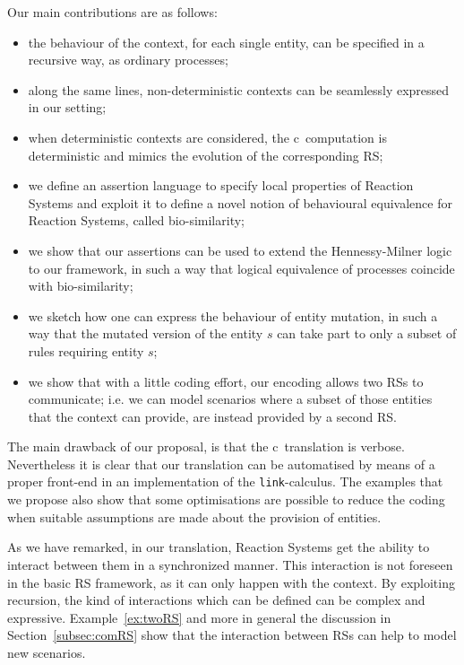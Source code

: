 Our main contributions are as follows:
\begin{itemize}
\item the behaviour of the context, for each single 
entity,
can be
specified in a recursive way, as ordinary processes;
\item along the same lines, non-deterministic contexts can be seamlessly expressed in our setting; 
\item when deterministic contexts are considered, the c\CNA \
computation is deterministic and mimics the evolution of the corresponding RS;
\item we define an assertion language to specify local properties of 
Reaction Systems and exploit it to define a novel notion of behavioural equivalence for Reaction Systems, called bio-similarity;
\item we show that our assertions can be used to extend the Hennessy-Milner logic to our framework, in such a way that logical equivalence of processes coincide with bio-similarity;
\item we sketch how one can express the behaviour of entity mutation,
in such a way that {\color{red} the mutated version of the entity
$s$ can}  take part to only a subset of rules requiring entity $s$;
\item we show that with a little coding effort, our encoding allows two RSs to
communicate; i.e. we can model scenarios where a subset of those entities that the context  can
provide, are instead provided by a second RS.
\end{itemize}

The main drawback of our proposal, is that the c\CNA \ translation is
verbose. Nevertheless it is clear that our
translation can be automatised by means of a proper front-end in
an implementation of the {\tt link}-calculus. 
The examples that we propose also show that some optimisations are possible
to reduce the coding when suitable assumptions are made about the provision of entities.

As we have remarked, in our translation, Reaction Systems 
get the ability to interact between them in a synchronized manner. 
This interaction is not foreseen in
the basic RS framework, as it can only happen with the context.
By exploiting recursion, the kind of interactions which can be 
defined can be complex and expressive.
Example~\ref{ex:twoRS} and more in general the discussion in 
Section~\ref{subsec:comRS}
 show that 
the interaction between RSs can help to model new scenarios.

